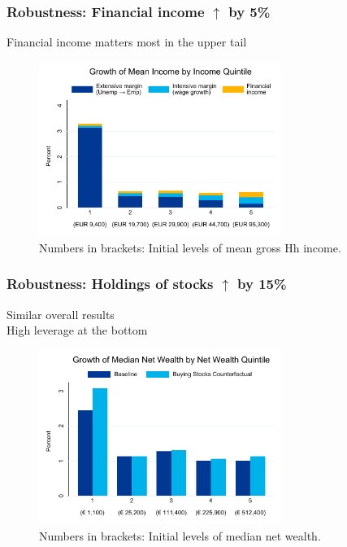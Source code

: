 \documentclass[pdflatex,aspectratio=169]{beamer}
\begin{document}
\begin{frame}\frametitle{\bf Robustness: Financial income $\uparrow$ by 5\% \hypertarget{FinInc}{}}
Financial income matters most in the upper tail \hyperlink{Robust}{}
\begin{figure}
\begin{center}
\includegraphics[width=0.7\textwidth]{./figures/meanIncomeByIncQuint_EA_decompFinInc_per4}\\
{\scriptsize Numbers in brackets: Initial levels of mean gross Hh income. }
\end{center}
\end{figure}

\end{frame}


\begin{frame}\frametitle{\bf Robustness: Holdings of stocks $\uparrow$ by 15\% \hypertarget{StockBoost}{}}
Similar overall results \hyperlink{Robust}{}\\
High leverage at the bottom
\begin{figure}
\begin{center}
\includegraphics[width=0.7\textwidth]{./figures/medianNetWealthByWquint_EA_stockBoost_15}\\[-2mm]
{\scriptsize Numbers in brackets: Initial levels of median net wealth. }
\end{center}
\end{figure}

\end{frame}
\end{document}
